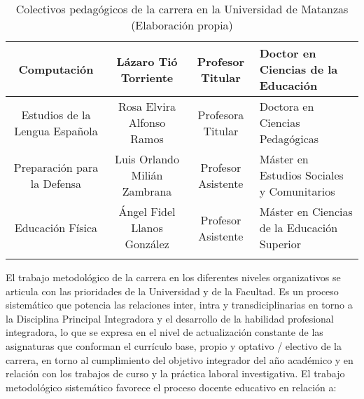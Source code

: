 {\begin{longtable}{|c|c|c|p{4.5cm}|}
	\hline
	Computación & \parbox[t]{3cm}{Lázaro Tió Torriente}  & Profesor Titular & Doctor en Ciencias de la Educación \\
	\hline
	\parbox[t]{3cm}{Estudios de la Lengua Española } & \parbox[t]{3cm}{Rosa Elvira Alfonso Ramos} & Profesora Titular & Doctora en Ciencias Pedagógicas  \\
	\hline
	\parbox[t]{3cm}{Preparación para la Defensa} & \parbox[t]{3cm}{Luis Orlando Milián Zambrana} & Profesor Asistente & Máster en Estudios Sociales y Comunitarios \\
	\hline
	Educación Física & \parbox[t]{3cm}{Ángel Fidel Llanos González} & Profesor Asistente & Máster en Ciencias de la Educación Superior \\
	\hline
	\caption{Colectivos pedagógicos de la carrera en la Universidad de Matanzas (Elaboración propia)} 
	\label{tableclaustro}
\end{longtable}

}%

El trabajo metodológico de la carrera en los diferentes niveles organizativos se articula con las prioridades de la Universidad y de la Facultad. Es un proceso sistemático que potencia las relaciones inter, intra y transdiciplinarias en torno a la Disciplina Principal Integradora y el desarrollo de la habilidad profesional integradora, lo que se expresa en el nivel de actualización constante de las asignaturas que conforman el currículo base, propio y optativo / electivo de la carrera, en torno al cumplimiento del objetivo integrador del año académico y en relación con los trabajos de curso y la práctica laboral investigativa. El trabajo metodológico sistemático favorece el proceso docente educativo en relación a:

